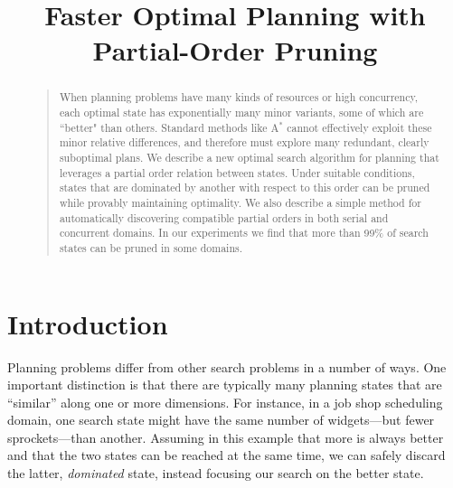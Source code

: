 \documentclass[letterpaper]{article}
\theoremstyle{plain} \newtheorem{theorem}{Theorem} \newtheorem{proposition}{Proposition} \newtheorem{lemma}{Lemma}
\theoremstyle{definition} \newtheorem{definition}{Definition} \newtheorem{conjecture}{Conjecture} \newtheorem*{example}{Example}
\theoremstyle{remark} \newtheorem*{remark}{Remark} \newtheorem*{note}{Note} \newtheorem{case}{Case}
\newcommand{\Astar}{A$^*$ }
\begin{document}
%
\title{Faster Optimal Planning with Partial-Order Pruning}
\author{}

\maketitle
\begin{abstract}
\begin{quote}
  When planning problems have many kinds of resources or high
  concurrency, each optimal state has exponentially many minor
  variants, some of which are ``better" than others. Standard methods
  like \Astar cannot effectively exploit these minor relative differences,
  and therefore must explore many redundant, clearly suboptimal
  plans. We describe a new optimal search algorithm for planning
  that leverages a partial order relation between states. Under
  suitable conditions, states that are dominated by another with
  respect to this order can be pruned while provably maintaining
  optimality. We also describe a simple method for automatically
  discovering compatible partial orders in both serial and concurrent
  domains. In our experiments we find that more than 99\% of search
  states can be pruned in some domains.
\end{quote}
\end{abstract}

\section{Introduction}

Planning problems differ from other search problems in a number of
ways. One important distinction is that there are typically many
planning states that are ``similar'' along one or more dimensions.
For instance, in a job shop scheduling domain, one search state
might have the same number of widgets---but fewer sprockets---than
another. Assuming in this example that more is always better and that the two states
can be reached at the same time, we can safely discard the latter,
\textit{dominated} state, instead focusing our search on the better
state.
\end{document}
